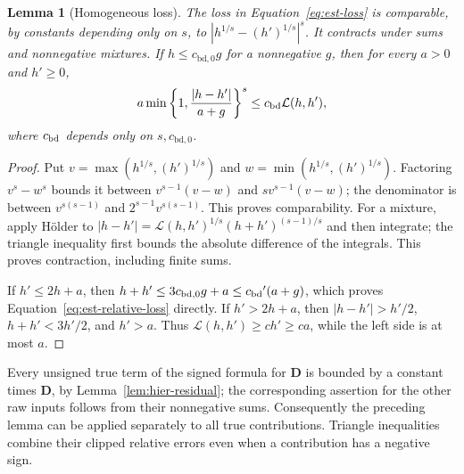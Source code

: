 \documentclass[11pt]{article}
\numberwithin{equation}{section}
\newtheorem{lemma}[theorem]{Lemma}
\theoremstyle{definition}
\theoremstyle{remark}
\begin{document}
\begin{lemma}[Homogeneous loss]\label{lem:est-loss}
The loss in Equation~\eqref{eq:est-loss} is comparable, by constants
depending only on $s$, to $|{h}^{1/s}-({h}')^{1/s}|^s$.  It contracts under
sums and nonnegative mixtures.  If ${h}\le {c_{\mathrm{bd},0}}{g}$ for a nonnegative ${g}$, then
for every $a>0$ and ${h}'\ge0$,
\begin{equation}
 a\min\left\{1,\frac{|{h}-{h}'|}{a+{g}}\right\}^{s}
       \le {c_{\rm bd}}\mathcal L({h},{h}'),
 \label{eq:est-relative-loss}
\end{equation}
where ${c_{\rm bd}}$ depends only on $s,{c_{\mathrm{bd},0}}$.
\end{lemma}
\begin{proof}
Put $v=\max({h}^{1/s},({h}')^{1/s})$ and
$w=\min({h}^{1/s},({h}')^{1/s})$.  Factoring $v^s-w^s$ bounds it between
$v^{s-1}(v-w)$ and $sv^{s-1}(v-w)$; the denominator is between
$v^{s(s-1)}$ and $2^{s-1}v^{s(s-1)}$.  This proves comparability.
For a mixture, apply H\"older to
$|{h}-{h}'|=\mathcal L({h},{h}')^{1/s}({h}+{h}')^{(s-1)/s}$ and then integrate;
the triangle inequality first bounds the absolute difference of the
integrals.  This proves contraction, including finite sums.

If ${h}'\le2{h}+a$, then ${h}+{h}'\le3{c_{\mathrm{bd},0}}{g}+a\le {c_{\rm bd}}'(a+{g})$, which proves
Equation~\eqref{eq:est-relative-loss} directly.  If ${h}'>2{h}+a$, then
$|{h}-{h}'|>{h}'/2$, ${h}+{h}'<3{h}'/2$, and ${h}'>a$.
Thus $\mathcal L({h},{h}')\ge c{h}'\ge ca$, while the left side is at most $a$.
\end{proof}

Every unsigned true term of the signed formula for ${\mathbf{D}}$ is bounded by a
constant times ${\mathbf{D}}$, by Lemma~\ref{lem:hier-residual}; the corresponding
assertion for the other raw inputs follows from their nonnegative sums.
Consequently the preceding lemma can be applied separately to all true
contributions.  Triangle inequalities combine their clipped relative
errors even when a contribution has a negative sign.
\end{document}
